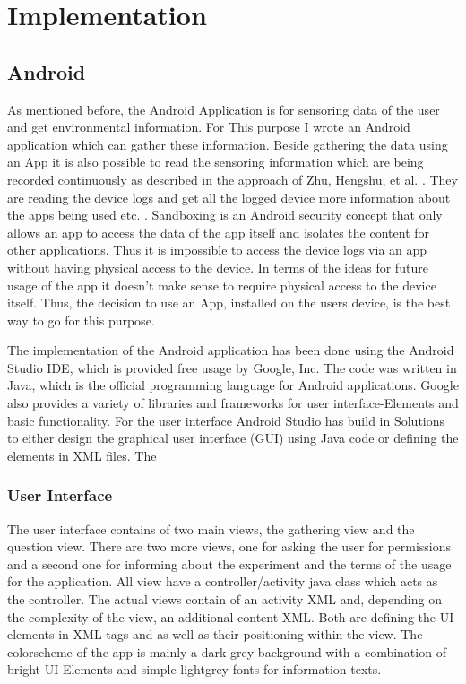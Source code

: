 \chapter{Implementation}

\begin{flushleft}

\end{flushleft}

\section{Android}
As mentioned before, the Android Application is for sensoring data of the user and get environmental information. For This purpose I wrote an Android application which can gather these information. 
Beside gathering the data using an App it is also possible to read the sensoring information which are being recorded continuously as described in the approach of
Zhu, Hengshu, et al. \cite{zhu2015mining}. They are reading the device logs and get all the logged device more information about the apps being used etc. .
Sandboxing is an Android security concept that only allows an app to access the data of the app itself and isolates the content for other applications. Thus it is impossible to access the device logs via an app without having physical access to the device. 
In terms of the ideas for future usage of the app it doesn't make sense to require physical access to the device itself. Thus, the decision to use an App, installed on the users device, is the best way to go for this purpose.

The implementation of the Android application has been done using the Android Studio IDE, which is provided free usage by Google, Inc. The code was written in Java, which is the official programming language for Android applications. Google also provides a variety of libraries and frameworks for user interface-Elements and basic functionality. For the user interface Android Studio has build in Solutions to either design the graphical user interface (GUI) using Java code or defining the elements in XML files. 
The  

\subsection{User Interface}
The user interface contains of two main views, the gathering view and the question view. There are two more views, one for asking the user for permissions and a second one for informing about the experiment and the terms of the usage for the application. 
All view have a controller/activity java class which acts as the controller. The actual views contain of an activity XML and, depending on the complexity of the view, an additional content XML. Both are defining the UI-elements in XML tags and as well as their positioning within the view. 
The colorscheme of the app is mainly a dark grey background with a combination of bright UI-Elements and simple lightgrey fonts for information texts.

